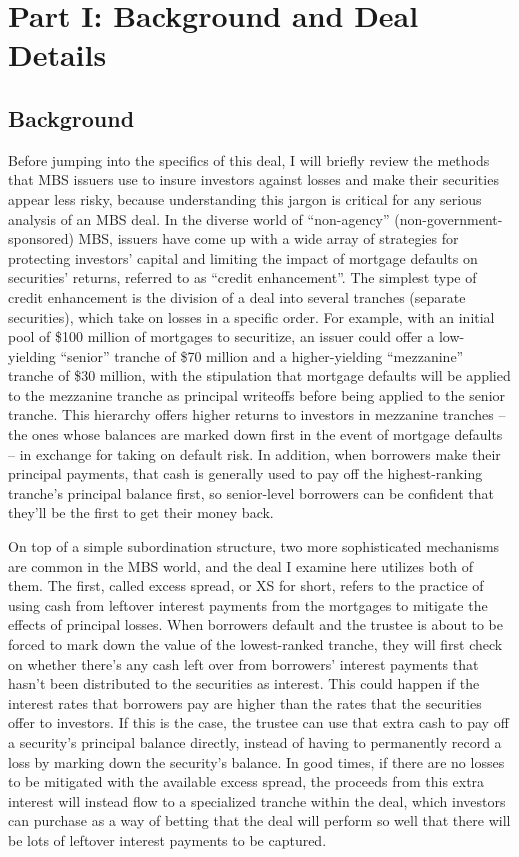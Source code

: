 \documentclass[12pt]{article}
\begin{document}
\section*{Part I: Background and Deal Details}
\subsection*{Background}
Before jumping into the specifics of this deal, I will briefly review the methods that MBS issuers use to insure investors against losses and make their securities appear less risky, because understanding this jargon is critical for any serious analysis of an MBS deal. In the diverse world of “non-agency” (non-government-sponsored) MBS, issuers have come up with a wide array of strategies for protecting investors’ capital and limiting the impact of mortgage defaults on securities’ returns, referred to as ``credit enhancement''. The simplest type of credit enhancement is the division of a deal into several tranches (separate securities), which take on losses in a specific order. For example, with an initial pool of \$100 million of mortgages to securitize, an issuer could offer a low-yielding “senior” tranche of \$70 million and a higher-yielding “mezzanine” tranche of \$30 million, with the stipulation that mortgage defaults will be applied to the mezzanine tranche as principal writeoffs before being applied to the senior tranche. This hierarchy offers higher returns to investors in mezzanine tranches – the ones whose balances are marked down first in the event of mortgage defaults – in exchange for taking on default risk. In addition, when borrowers make their principal payments, that cash is generally used to pay off the highest-ranking tranche’s principal balance first, so senior-level borrowers can be confident that they’ll be the first to get their money back.
	
On top of a simple subordination structure, two more sophisticated mechanisms are common in the MBS world, and the deal I examine here utilizes both of them. The first, called excess spread, or XS for short, refers to the practice of using cash from leftover interest payments from the mortgages to mitigate the effects of principal losses. When borrowers default and the trustee is about to be forced to mark down the value of the lowest-ranked tranche, they will first check on whether there’s any cash left over from borrowers’ interest payments that hasn’t been distributed to the securities as interest. This could happen if the interest rates that borrowers pay are higher than the rates that the securities offer to investors. If this is the case, the trustee can use that extra cash to pay off a security’s principal balance directly, instead of having to permanently record a loss by marking down the security’s balance. In good times, if there are no losses to be mitigated with the available excess spread, the proceeds from this extra interest will instead flow to a specialized tranche within the deal, which investors can purchase as a way of betting that the deal will perform so well that there will be lots of leftover interest payments to be captured.
	
\end{document}
